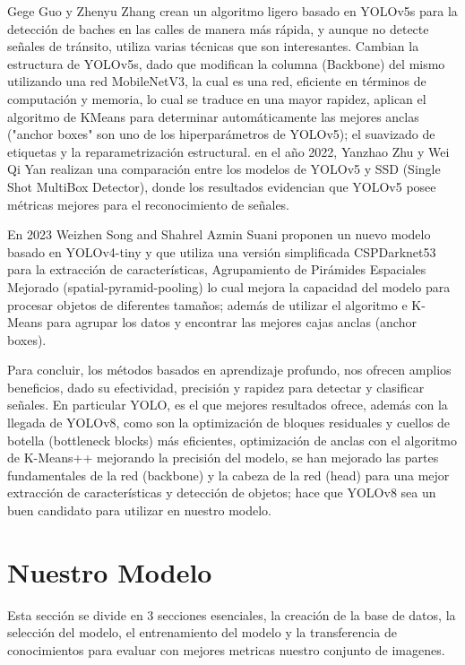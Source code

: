 \documentclass{article}
\begin{document}
Gege Guo y Zhenyu Zhang \cite{ref9} crean un algoritmo ligero basado en YOLOv5s para la detección de baches en las calles de manera más rápida, y aunque no detecte señales de tránsito, utiliza varias técnicas que son interesantes. Cambian la estructura de YOLOv5s, dado que modifican la columna (Backbone) del mismo utilizando una red MobileNetV3, la cual es una red, eficiente en términos de computación y memoria, lo cual se traduce en una mayor rapidez, aplican el algoritmo de KMeans para determinar automáticamente las mejores anclas ("anchor boxes" son uno de los hiperparámetros de YOLOv5); el suavizado de etiquetas y la reparametrización estructural. en el año 2022, Yanzhao Zhu y Wei Qi Yan \cite{ref1} realizan una comparación entre los modelos de YOLOv5 y SSD (Single Shot MultiBox Detector), donde los resultados evidencian que YOLOv5 posee métricas mejores para el reconocimiento de señales.


En 2023 Weizhen Song and Shahrel Azmin Suani\cite{ref2} proponen un nuevo modelo basado en YOLOv4-tiny y que utiliza una versión simplificada CSPDarknet53 para la extracción de características, Agrupamiento de Pirámides Espaciales Mejorado (spatial-pyramid-pooling) lo cual mejora la capacidad del modelo para procesar objetos de diferentes tamaños; además de utilizar el algoritmo e K-Means para agrupar los datos y encontrar las mejores cajas anclas (anchor boxes).

Para concluir, los métodos basados en aprendizaje profundo, nos ofrecen amplios beneficios, dado su efectividad, precisión y rapidez para detectar y clasificar señales. En particular YOLO, es el que mejores resultados ofrece, además con la llegada de YOLOv8, como son la optimización de bloques residuales y cuellos de botella (bottleneck blocks) más eficientes, optimización de anclas con el algoritmo de K-Means++ mejorando la precisión del modelo, se han mejorado las partes fundamentales de la red (backbone) y la cabeza de la red (head) para una mejor extracción de características y detección de objetos; hace que YOLOv8 sea un buen candidato para utilizar en nuestro modelo.
\section{Nuestro Modelo}
Esta sección se divide en 3 secciones esenciales, la creación de la base de datos, la selección del modelo, el entrenamiento del modelo y la transferencia de conocimientos para evaluar con mejores metricas nuestro conjunto de imagenes.
\end{document}
